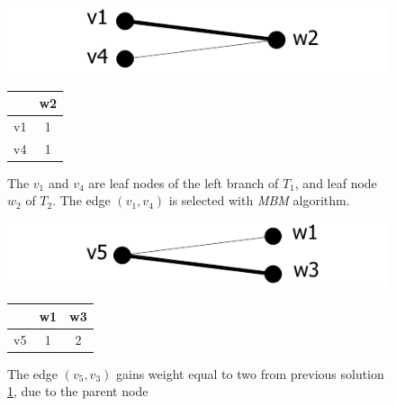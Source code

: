 \documentclass{report}
\begin{document}
\begin{figure}[h]
  \begin{minipage}[h]{0.60\linewidth}
    \centering
    \includegraphics[scale=0.95]{Figures/algorithms/TD/3ex.pdf}\\[0.1cm]
  \end{minipage}%
  \begin{minipage}[h]{0.30\linewidth}
    \centering
\begin{tabular}{|c|c|}
\hline
   & w2 \\ \hline
v1 &  \cellcolor[gray]{0.9}1  \\ \hline
v4 & 1  \\ \hline
\end{tabular}
\end{minipage}
\caption[]{The $v_{1}$ and $v_{4}$ are leaf nodes of the left branch of $ T_{1}$, and leaf node $w_{2}$ of $ T_{2}$. The edge $(v_{1},v_{4})$ is selected with \emph{MBM} algorithm. }
\label{fig:ex3}
\end{figure}

\begin{figure}
  \begin{minipage}[h]{0.60\linewidth}
    \centering
    \includegraphics[scale=0.95]{Figures/algorithms/TD/2ex.pdf}\\[0.1cm]
  \end{minipage}%
  \begin{minipage}[b]{0.30\linewidth}
    \centering
\begin{tabular}{|c|c|c|}
\hline
   & w1 & w3                        \\ \hline
v5 & 1  & \cellcolor[gray]{0.9} 2 \\ \hline
\end{tabular}
\end{minipage}
\caption[]{The edge $(v_{5},v_{3})$ gains weight equal to two from previous solution \ref{fig:ex3}, due to the parent node}
\label{fig:ex2}
\end{figure}
\end{document}
